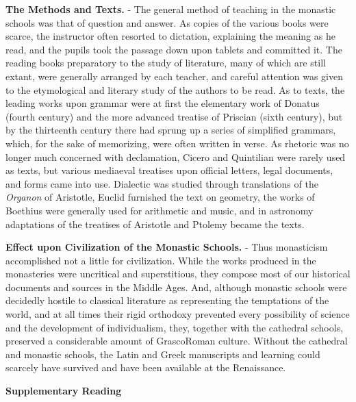 \documentclass[]{book}
\begin{document}
\textbf{The Methods and Texts.} - The general method of teaching in the monastic schools was that of question and answer. As copies of the various books were scarce, the instructor often resorted to dictation, explaining the meaning as he read, and the pupils took the passage down upon tablets and committed it. The reading books preparatory to the study of literature, many of which are still extant, were generally arranged by each teacher, and careful attention was given to the etymological and literary study of the authors to be read. As to texts, the leading works upon grammar were at first the elementary work of Donatus (fourth century) and the more advanced treatise of Priscian (sixth century), but by the thirteenth century there had sprung up a series of simplified grammars, which, for the sake of memorizing, were often written in verse. As rhetoric was no longer much concerned with declamation, Cicero and Quintilian were rarely used as texts, but various mediaeval treatises upon official letters, legal documents, and forms came into use. Dialectic was studied through translations of the \emph{Organon} of Aristotle, Euclid furnished the text on geometry, the works of Boethius were generally used for arithmetic and music, and in astronomy adaptations of the treatises of Aristotle and Ptolemy became the texts.

\textbf{Effect upon Civilization of the Monastic Schools.} - Thus monasticism accomplished not a little for civilization. While the works produced in the monasteries were uncritical and superstitious, they compose most of our historical documents and sources in the Middle Ages. And, although monastic schools were decidedly hostile to classical literature as representing the temptations of the world, and at all times their rigid orthodoxy prevented every possibility of science and the development of individualism, they, together with the cathedral schools, preserved a considerable amount of GrascoRoman culture. Without the cathedral and monastic schools, the Latin and Greek manuscripts and learning could scarcely have survived and have been available at the Renaissance.

\textbf{Supplementary Reading}
\end{document}
